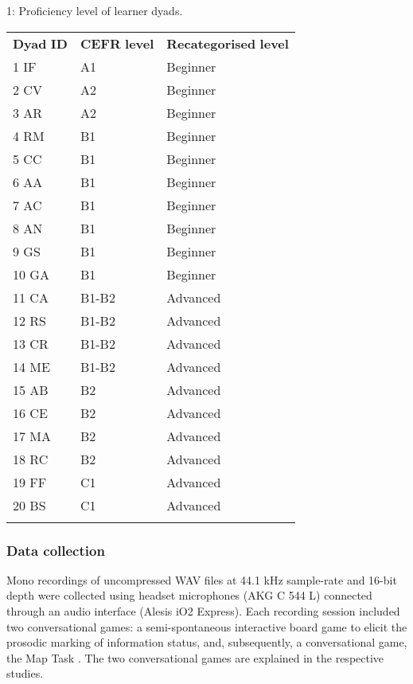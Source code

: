 \begin{stylelsTableHeading}%
\begin{table}
\caption{1: Proficiency level of learner dyads.}
\label{tab:key:1}
\end{table}\end{stylelsTableHeading}


\begin{tabularx}{\textwidth}{XXX}

\lsptoprule

          \textbf{Dyad} \textbf{ID} & \textbf{CEFR} \textbf{level} & \textbf{Recategorised} \textbf{level}\\
1  IF & A1 & Beginner\\
2  CV & A2 & Beginner\\
3  AR & A2 & Beginner\\
4  RM & B1 & Beginner\\
5  CC & B1 & Beginner\\
6  AA & B1 & Beginner\\
7  AC & B1 & Beginner\\
8  AN & B1 & Beginner\\
9  GS & B1 & Beginner\\
10  GA & B1 & Beginner\\
11  CA & B1-B2 & Advanced\\
12  RS & B1-B2 & Advanced\\
13  CR & B1-B2 & Advanced\\
14  ME & B1-B2 & Advanced\\
15  AB & B2 & Advanced\\
16  CE & B2 & Advanced\\
17  MA & B2 & Advanced\\
18  RC & B2 & Advanced\\
19  FF & C1 & Advanced\\
20  BS & C1 & Advanced\\
\lspbottomrule
\end{tabularx}
\subsubsection{Data collection}
\hypertarget{Toc191305880}{}
Mono recordings of uncompressed WAV files at 44.1 kHz sample-rate and 16-bit depth were collected using headset microphones (AKG C 544 L) connected through an audio interface (Alesis iO2 Express). Each recording session included two conversational games: a semi-spontaneous interactive board game to elicit the prosodic marking of information status, and, subsequently, a conversational game, the Map Task \citep{AndersonEtAl1991}. The two conversational games are explained in the respective studies.

